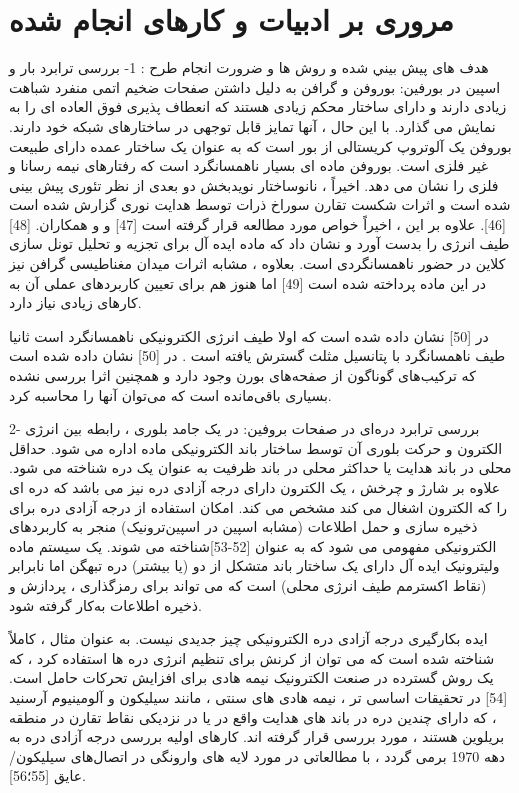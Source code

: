 \chapter{مروری بر ادبیات و کار‌های انجام شده}
\clearpage
هدف های پيش بيني شده و روش ها و ضرورت انجام طرح :
1-	بررسی ترابرد بار و اسپین در بورفین:
بوروفن و گرافن به دلیل داشتن صفحات ضخیم اتمی منفرد شباهت زیادی دارند و دارای ساختار محکم زیادی هستند که انعطاف پذیری فوق العاده ای را به نمایش می گذارد. با این حال ، آنها تمایز قابل توجهی در ساختارهای شبکه خود دارند. بوروفن یک آلوتروپ کریستالی از بور است که به عنوان یک ساختار عمده دارای طبیعت غیر فلزی است. بوروفن ماده ای بسیار ناهمسانگرد است که رفتارهای نیمه رسانا و فلزی را نشان می دهد. اخیراً ، نانوساختار نویدبخش دو بعدی از نظر تئوری پیش بینی شده است و اثرات شکست تقارن سوراخ ذرات توسط هدایت نوری گزارش شده است [46]. علاوه بر این ، اخیراً خواص  مورد مطالعه قرار گرفته است [47] و  و همکاران. [48] طیف انرژی را بدست آورد و نشان داد که ماده ایده آل برای تجزیه و تحلیل تونل سازی کلاین در حضور ناهمسانگردی است. بعلاوه ، مشابه اثرات میدان مغناطیسی گرافن نیز در این ماده پرداخته شده است [49] اما هنوز هم برای تعیین کاربردهای عملی آن به کارهای زیادی نیاز دارد.

در [50] نشان داده شده است که اولا طیف انرژی الکترونیکی ناهمسانگرد است ثانیا طیف ناهمسانگرد با پتانسیل مثلث گسترش یافته است .
در [50] نشان داده شده‌ است که  ترکیب‌های گوناگون از صفحه‌های بورن وجود دارد و همچنین اثرا بررسی نشده بسیاری باقی‌مانده است که می‌توان آنها را محاسبه کرد.

2-	بررسی ترابرد دره‌ای در صفحات بروفین:
در یک جامد بلوری ، رابطه بین انرژی الکترون و حرکت بلوری آن توسط ساختار باند الکترونیکی ماده اداره می شود. حداقل محلی در باند هدایت یا حداکثر محلی در باند ظرفیت به عنوان یک دره شناخته می شود. علاوه بر شارژ و چرخش ، یک الکترون دارای درجه آزادی دره نیز می باشد که دره ای را که الکترون اشغال می کند مشخص می کند. امکان استفاده از درجه آزادی دره برای ذخیره سازی و حمل اطلاعات (مشابه اسپین در اسپین‌ترونیک) منجر به کاربردهای الکترونیکی مفهومی می شود که به عنوان  [52-53]شناخته می شوند. یک سیستم ماده ولیترونیک ایده آل دارای یک ساختار باند متشکل از دو (یا بیشتر) دره تبهگن اما نابرابر (نقاط اکسترمم طیف انرژی محلی) است که می تواند برای رمزگذاری ، پردازش و ذخیره اطلاعات به‌کار گرفته شود.

ایده بکارگیری درجه آزادی دره الکترونیکی چیز جدیدی نیست. به عنوان مثال ، کاملاً شناخته شده است که می توان از کرنش برای تنظیم انرژی دره ها استفاده کرد ، که یک روش گسترده در صنعت الکترونیک نیمه هادی برای افزایش تحرکات حامل است.[54] در تحقیقات اساسی تر ، نیمه هادی های سنتی ، مانند سیلیکون و آلومینیوم آرسنید  ، که دارای چندین دره در باند های هدایت واقع در یا در نزدیکی نقاط تقارن  در منطقه بریلوین هستند ، مورد بررسی قرار گرفته اند. کارهای اولیه بررسی درجه آزادی دره به دهه 1970 برمی گردد ، با مطالعاتی در مورد لایه های وارونگی در اتصال‌های سیلیکون/عایق [55؛56].

